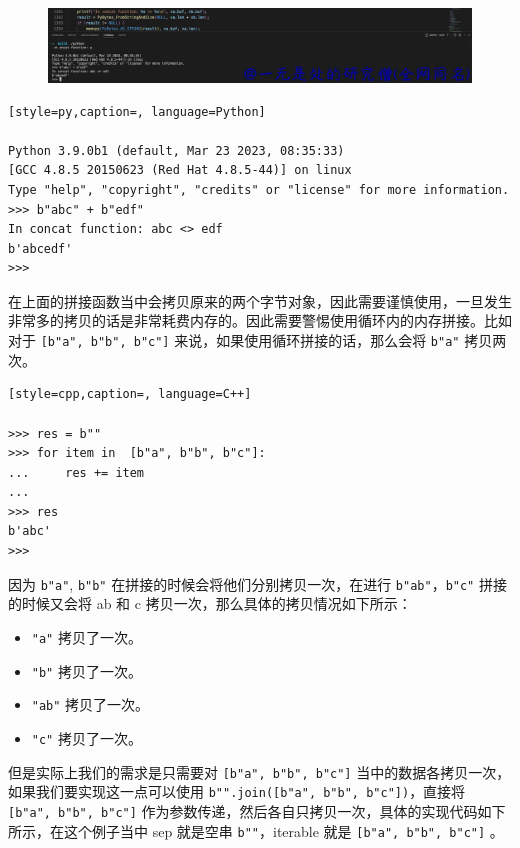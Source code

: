     \begin{figure}[H]
        \centering
            \includegraphics[scale=.2]{images/30-bytes.png}
						\caption{ }
        \label{fig:my_label}
    \end{figure}
    
\begin{lstlisting}[style=py,caption=, language=Python]

Python 3.9.0b1 (default, Mar 23 2023, 08:35:33) 
[GCC 4.8.5 20150623 (Red Hat 4.8.5-44)] on linux
Type "help", "copyright", "credits" or "license" for more information.
>>> b"abc" + b"edf"
In concat function: abc <> edf
b'abcedf'
>>> 
\end{lstlisting}
在上面的拼接函数当中会拷贝原来的两个字节对象，因此需要谨慎使用，一旦发生非常多的拷贝的话是非常耗费内存的。因此需要警惕使用循环内的内存拼接。比如对于 \verb|[b"a", b"b", b"c"]| 来说，如果使用循环拼接的话，那么会将 \verb|b"a"| 拷贝两次。
\begin{lstlisting}[style=cpp,caption=, language=C++]

>>> res = b""
>>> for item in  [b"a", b"b", b"c"]:
...     res += item
...
>>> res
b'abc'
>>>
\end{lstlisting}
因为 \verb|b"a"|, \verb|b"b"| 在拼接的时候会将他们分别拷贝一次，在进行 \verb|b"ab"|，\verb|b"c"| 拼接的时候又会将 ab 和 c 拷贝一次，那么具体的拷贝情况如下所示：
\begin{itemize}
\item \verb|"a"| 拷贝了一次。 
\item \verb|"b"| 拷贝了一次。 
\item \verb|"ab"| 拷贝了一次。 
\item \verb|"c"| 拷贝了一次。 
\end{itemize}
但是实际上我们的需求是只需要对 \verb|[b"a", b"b", b"c"]| 当中的数据各拷贝一次，如果我们要实现这一点可以使用 \verb|b"".join([b"a", b"b", b"c"])|，直接将 \verb|[b"a", b"b", b"c"]| 作为参数传递，然后各自只拷贝一次，具体的实现代码如下所示，在这个例子当中 sep 就是空串 \verb|b""|，iterable 就是 \verb|[b"a", b"b", b"c"]| 。

